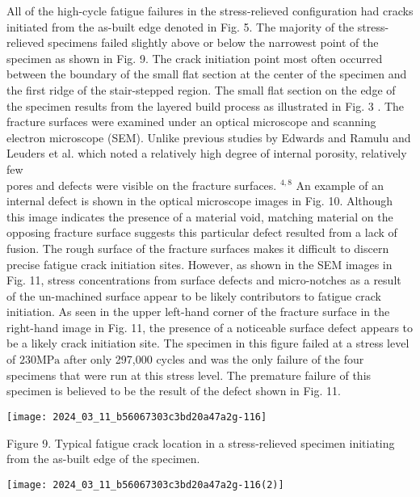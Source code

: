 \documentclass[10pt]{article}
\begin{document}
All of the high-cycle fatigue failures in the stress-relieved configuration had cracks initiated from the as-built edge denoted in Fig. 5. The majority of the stress-relieved specimens failed slightly above or below the narrowest point of the specimen as shown in Fig. 9. The crack initiation point most often occurred between the boundary of the small flat section at the center of the specimen and the first ridge of the stair-stepped region. The small flat section on the edge of the specimen results from the layered build process as illustrated in Fig. 3 . The fracture surfaces were examined under an optical microscope and scanning electron microscope (SEM). Unlike previous studies by Edwards and Ramulu and Leuders et al. which noted a relatively high degree of internal porosity, relatively few\\
pores and defects were visible on the fracture surfaces. ${ }^{4,8}$ An example of an internal defect is shown in the optical microscope images in Fig. 10. Although this image indicates the presence of a material void, matching material on the opposing fracture surface suggests this particular defect resulted from a lack of fusion. The rough surface of the fracture surfaces makes it difficult to discern precise fatigue crack initiation sites. However, as shown in the SEM images in Fig. 11, stress concentrations from surface defects and micro-notches as a result of the un-machined surface appear to be likely contributors to fatigue crack initiation. As seen in the upper left-hand corner of the fracture surface in the right-hand image in Fig. 11, the presence of a noticeable surface defect appears to be a likely crack initiation site. The specimen in this figure failed at a stress level of $230 \mathrm{MPa}$ after only 297,000 cycles and was the only failure of the four specimens that were run at this stress level. The premature failure of this specimen is believed to be the result of the defect shown in Fig. 11.

\begin{center}
\texttt{[image: 2024\_03\_11\_b56067303c3bd20a47a2g-116]}
\end{center}

Figure 9. Typical fatigue crack location in a stress-relieved specimen initiating from the as-built edge of the specimen.

\begin{center}
\texttt{[image: 2024\_03\_11\_b56067303c3bd20a47a2g-116(2)]}
\end{center}
\end{document}
